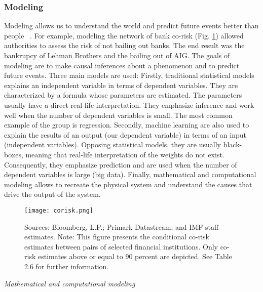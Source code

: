 \subsubsection{Modeling}
Modeling allows us to understand the world and predict future events better than people~\citep{tetlock2005} .
For example, modeling the network of bank co-risk (Fig. \ref{fig:corisk}) allowed authorities to assess the risk of not bailing out banks.
The end result was the bankrupcy of Lehman Brothers and the bailing out of AIG.
The goals of modeling are to make causal inferences about a phenomenon and to predict future events.
Three main models are used:
Firstly, traditional statistical models explains an independent variable in terms of dependent variables. 
They are characterized by a formula whose parameters are estimated.
The parameters usually have a direct real-life interpretation.
They emphasize inference and work well when the number of dependent variables is small.
The most common example of the group is regression.
Secondly, machine learning are also used to explain the results of an output (our dependent variable) in terms of an input (independent variables).
Opposing statistical models, they are usually black-boxes, meaning that real-life interpretation of the weights do not exist.
Consequently, they emphasize prediction and are used when the number of dependent variables is large (big data).
Finally, mathematical and computational modeling allows to recreate the physical system and understand the causes that drive the output of the system.



\begin{figure}[h!]
\begin{center}
\texttt{[image: corisk.png]}
\end{center}
\caption{Sources: Bloomberg, L.P.; Primark Datastream; and IMF staff estimates.
Note: This figure presents the conditional co-risk estimates between pairs of selected financial
institutions. Only co-risk estimates above or equal to 90 percent are depicted. See Table 2.6 for further
information.~\citep{corisk2009}}
\label{fig:corisk}
\end{figure}


\textit{Mathematical and computational modeling}

